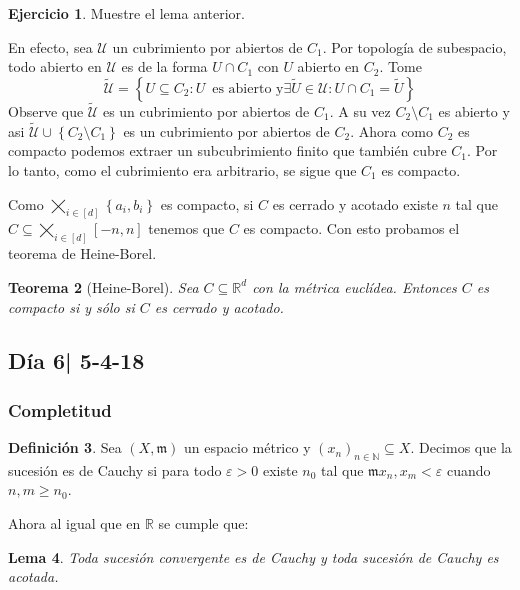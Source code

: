 \documentclass[12pt]{article}
\theoremstyle{plain}
\newtheorem{Th}{Teorema}[subsection]   %
\newtheorem{Lem}[Th]{Lema}             %
\theoremstyle{definition}
\newtheorem{Def}[Th]{Definición}       %
\newtheorem{Ej}[Th]{Ejercicio}
\theoremstyle{remark}
\numberwithin{equation}{section}
\newcommand{\bN}{\mathbb{N}}        %
\newcommand{\bR}{\mathbb{R}}        %
\newcommand{\mm}{\mathfrak{m}}      %
\newcommand{\cU}{\mathcal{U}}       %
\renewcommand{\geq}{\geqslant}      %
\renewcommand{\:}{\colon}           %
\newcommand{\conj}[1]{\left\lbrace#1\right\rbrace}
\newcommand{\bonj}[1]{\left\lbrack#1\right\rbrack}
\begin{document}
\begin{multicols}{2}
\begin{Ej}
  Muestre el lema anterior.
\end{Ej}

\begin{ptcb}
En efecto, sea $\cU$ un cubrimiento por abiertos de $C_1$. Por topología de subespacio, todo abierto en $\cU$ es de la forma $U\cap C_1$ con $U$ abierto en $C_2$. Tome $$\tilde{\cU}=\conj{U\subseteq C_2\colon U\,\,\,\text{es abierto y}\exists \tilde{U}\in\cU\colon U\cap C_1=\tilde{U}}$$Observe que $\tilde{\cU}$ es un cubrimiento por abiertos de $C_1$. A su vez $C_2\setminus C_1$ es abierto y asi $\tilde{\cU}\cup\conj{C_2\setminus C_1}$ es un cubrimiento por abiertos de $C_2$. Ahora como $C_2$ es compacto podemos extraer un subcubrimiento finito que también cubre $C_1$. Por lo tanto, como el cubrimiento era arbitrario, se sigue que $C_1$ es compacto.
\end{ptcb}

Como $\bigtimes_{i\in\bonj{d}}\conj{a_i,b_i}$ es compacto,  si $C$ es cerrado y acotado existe $n$ tal que $C\subseteq\bigtimes_{i\in\bonj{d}}\bonj{-n,n}$ tenemos que $C$ es compacto. Con esto probamos el teorema de Heine-Borel.
\begin{Th}[Heine-Borel]\label{thm:HeineBorel}
  Sea $C\subseteq\bR^d$ con la métrica euclídea. Entonces $C$ es compacto si y sólo si $C$ es cerrado y acotado.
\end{Th}

\subsection{Día 6| 5-4-18}

\subsubsection*{Completitud}

\begin{Def}
  Sea $(X,\mm)$ un espacio métrico y $(x_n)_{n\in\bN}\subseteq X$. Decimos que la sucesión es de Cauchy si para todo $\varepsilon>0$ existe $n_0$ tal que $\mm{x_n,x_m}<\varepsilon$ cuando $n,m\geq n_0$.
\end{Def}

Ahora al igual que en $\bR$ se cumple que:

\begin{Lem}
  Toda sucesión convergente es de Cauchy y toda sucesión de Cauchy es acotada.
\end{Lem}


\end{multicols}
\end{document}
